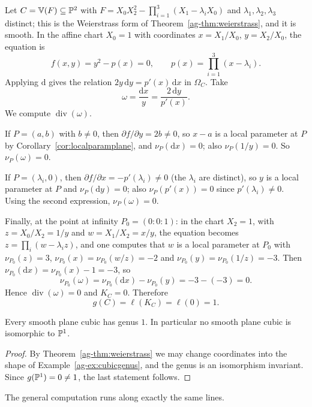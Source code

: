 \documentclass[a4paper]{scrartcl}
\newcommand{\V}{\mathbb{V}}
\newcommand{\dee}{\mathrm{d}}
\DeclareMathOperator{\Divv}{div}
\begin{document}
\begin{example}\label{ag-ex:cubicgenus}
	Let $C = \V(F) \subseteq \PP^2$ with $F = X_0X_2^2 - \prod_{i=1}^3(X_1 - \lambda_iX_0)$ and $\lambda_1,\lambda_2,\lambda_3$ distinct; this is the Weierstrass form of Theorem~\ref{ag-thm:weierstrass}, and it is smooth. In the affine chart $X_0 = 1$ with coordinates $x = X_1/X_0$, $y = X_2/X_0$, the equation is
	$$f(x,y) = y^2 - p(x) = 0, \qquad p(x) = \prod_{i=1}^3(x - \lambda_i).$$
	Applying $\dee$ gives the relation $2y\,\dee y = p'(x)\,\dee x$ in $\Omega_C$. Take
	$$\omega = \frac{\dee x}{y} = \frac{2\,\dee y}{p'(x)}.$$
	We compute $\Divv(\omega)$.

	If $P = (a,b)$ with $b \neq 0$, then $\partial f/\partial y = 2b \neq 0$, so $x - a$ is a local parameter at $P$ by Corollary~\ref{cor:localparamplane}, and $\nu_P(\dee x) = 0$; also $\nu_P(1/y) = 0$. So $\nu_P(\omega) = 0$.

	If $P = (\lambda_i,0)$, then $\partial f/\partial x = -p'(\lambda_i)\neq 0$ (the $\lambda_i$ are distinct), so $y$ is a local parameter at $P$ and $\nu_P(\dee y) = 0$; also $\nu_P(p'(x)) = 0$ since $p'(\lambda_i)\neq0$. Using the second expression, $\nu_P(\omega) = 0$.

	Finally, at the point at infinity $P_0 = (0:0:1)$: in the chart $X_2 = 1$, with $z = X_0/X_2 = 1/y$ and $w = X_1/X_2 = x/y$, the equation becomes $z = \prod_i(w-\lambda_iz)$, and one computes that $w$ is a local parameter at $P_0$ with $\nu_{P_0}(z) = 3$, $\nu_{P_0}(x) = \nu_{P_0}(w/z) = -2$ and $\nu_{P_0}(y) = \nu_{P_0}(1/z) = -3$. Then $\nu_{P_0}(\dee x) = \nu_{P_0}(x) - 1 = -3$, so
	$$\nu_{P_0}(\omega) = \nu_{P_0}(\dee x) - \nu_{P_0}(y) = -3 - (-3) = 0.$$
	Hence $\Divv(\omega) = 0$ and $K_C = 0$. Therefore
	$$g(C) = \ell(K_C) = \ell(0) = 1.$$
\end{example}

\begin{theorem}\label{thm:cubicgenus1}
	Every smooth plane cubic has genus $1$. In particular no smooth plane cubic is isomorphic to $\mathbb{P}^1$.
\end{theorem}

\begin{proof}
	By Theorem~\ref{ag-thm:weierstrass} we may change coordinates into the shape of Example~\ref{ag-ex:cubicgenus}, and the genus is an isomorphism invariant. Since $g(\mathbb{P}^1) = 0 \neq 1$, the last statement follows.
\end{proof}

The general computation runs along exactly the same lines.
\end{document}
